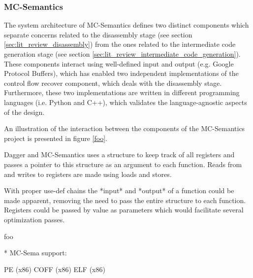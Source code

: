
\subsubsection{MC-Semantics}


The system architecture of MC-Semantics defines two distinct components which separate concerns related to the disassembly stage (see section \ref{sec:lit_review_disassembly}) from the ones related to the intermediate code generation stage (see section \ref{sec:lit_review_intermediate_code_generation}). These components interact using well-defined input and output (e.g. Google Protocol Buffers), which has enabled two independent implementations of the control flow recover component, which deals with the disassembly stage. Furthermore, these two implementations are written in different programming languages (i.e. Python and C++), which validates the language-agnostic aspects of the design.


An illustration of the interaction between the components of the MC-Semantics project is presented in figure \ref{foo}.

Dagger and MC-Semantics uses a structure to keep track of all registers and passes a pointer to this structure as an argument to each function. Reads from and writes to registers are made using loads and stores.

With proper use-def chains the *input* and *output* of a function could be made apparent, removing the need to pass the entire structure to each function. Registers could be passed by value as parameters which would facilitate several optimization passes.





foo \cite{mcsema}

* MC-Sema support:

PE (x86)
COFF (x86)
ELF (x86)
